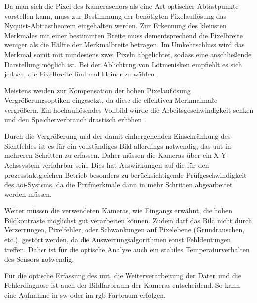         Da man sich die Pixel des Kamerasenors als eine Art optischer Abtastpunkte vorstellen kann, muss zur Bestimmung der benötigten Pixelauflösung das Nyquist-Abttastheorem eingehalten werden.
        Zur Erkennung des kleinsten Merkmales mit einer bestimmten Breite muss dementsprechend die Pixelbreite weniger als die Hälfte der Merkmalbreite betragen.
        Im Umkehrschluss wird das Merkmal somit mit mindestens zwei Pixeln abgelichtet, sodass eine anschließende Darstellung möglich ist.
        Bei der Ablichtung von Lötmenisken empfiehlt es sich jedoch, die Pixelbreite fünf mal kleiner zu wählen. \cite{berger_test-_2012}

        Meistens werden zur Kompensation der hohen Pixelauflösung Vergrößerungsoptiken eingesetzt, da diese die effektiven Merkmalmaße vergrößern.
        Ein hochauflösendes Vollbild würde die Arbeitsgeschwindigkeit senken und den Speicherverbrauch drastisch erhöhen \cite{berger_test-_2012}.

        Durch die Vergrößerung und der damit einhergehenden Einschränkung des Sichtfeldes ist es für ein vollständiges Bild allerdings notwendig, das \ac{uut} in mehreren Schritten zu erfassen.
        Daher müssen die Kameras über ein X-Y-Achssystem verfahrbar sein.
        Dies hat Auswirkungen auf die für den prozesstaktgleichen Betrieb besonders zu berücksichtigende Prüfgeschwindigkeit des \ac{aoi}-Systems, da die Prüfmerkmale dann in mehr Schritten abgearbeitet werden müssen. \cite{berger_test-_2012}

        Weiter müssen die verwendeten Kameras, wie Eingangs erwähnt, die hohen Bildkontraste möglichst gut verarbeiten können.
        Zudem darf das Bild nicht durch Verzerrungen, Pixelfehler, oder Schwankungen auf Pixelebene (Grundrauschen, etc.), gestört werden, da die Auswertungsalgorithmen sonst Fehldeutungen treffen. 
        Daher ist für die optische Analyse auch ein stabiles Temperaturverhalten des Sensors notwendig. \cite{berger_test-_2012}

        Für die optische Erfassung des \ac{uut}, die Weiterverarbeitung der Daten und die Fehlerdiagnose ist auch der Bildfarbraum der Kameras entscheidend.
        So kann eine Aufnahme in \ac{sw} oder im \ac{rgb} Farbraum erfolgen. \cite{berger_test-_2012}

